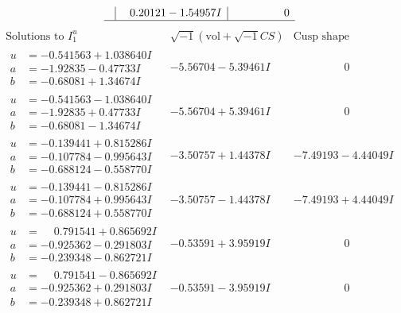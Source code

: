 \documentclass[1p]{elsarticle_modified}
\theoremstyle{definition}
\newcommand{\I}{\sqrt{-1}}
\begin{document}
$$\begin{array}{c|c|c}
 & \phantom{-}0.20121 - 1.54957 I & \phantom{-0.000000 } 0\\
 \hline 
 \end{array}$$\newpage$$\begin{array}{c|c|c}  
\text{Solutions to }I^u_{1}& \I (\text{vol} + \sqrt{-1}CS) & \text{Cusp shape}\\
 \hline 
\begin{aligned}
u &= -0.541563 + 1.038640 I \\
a &= -1.92835 - 0.47733 I \\
b &= -0.68081 + 1.34674 I\end{aligned}
 & -5.56704 - 5.39461 I & \phantom{-0.000000 } 0 \\ \hline\begin{aligned}
u &= -0.541563 - 1.038640 I \\
a &= -1.92835 + 0.47733 I \\
b &= -0.68081 - 1.34674 I\end{aligned}
 & -5.56704 + 5.39461 I & \phantom{-0.000000 } 0 \\ \hline\begin{aligned}
u &= -0.139441 + 0.815286 I \\
a &= -0.107784 - 0.995643 I \\
b &= -0.688124 - 0.558770 I\end{aligned}
 & -3.50757 + 1.44378 I & -7.49193 - 4.44049 I \\ \hline\begin{aligned}
u &= -0.139441 - 0.815286 I \\
a &= -0.107784 + 0.995643 I \\
b &= -0.688124 + 0.558770 I\end{aligned}
 & -3.50757 - 1.44378 I & -7.49193 + 4.44049 I \\ \hline\begin{aligned}
u &= \phantom{-}0.791541 + 0.865692 I \\
a &= -0.925362 - 0.291803 I \\
b &= -0.239348 - 0.862721 I\end{aligned}
 & -0.53591 + 3.95919 I & \phantom{-0.000000 } 0 \\ \hline\begin{aligned}
u &= \phantom{-}0.791541 - 0.865692 I \\
a &= -0.925362 + 0.291803 I \\
b &= -0.239348 + 0.862721 I\end{aligned}
 & -0.53591 - 3.95919 I & \phantom{-0.000000 } 0 \\ \hline\begin{aligned}

\end{aligned}
\end{array}$$
\end{document}
